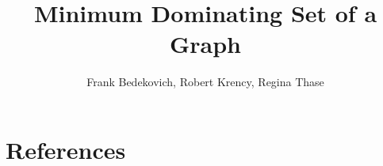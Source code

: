 \documentclass[12pt]{article}
\title{Minimum Dominating Set of a Graph}
\author{Frank Bedekovich, Robert Krency, Regina Thase}
\begin{document}
\maketitle

\pagebreak



\pagebreak

\section*{References}
\end{document}

